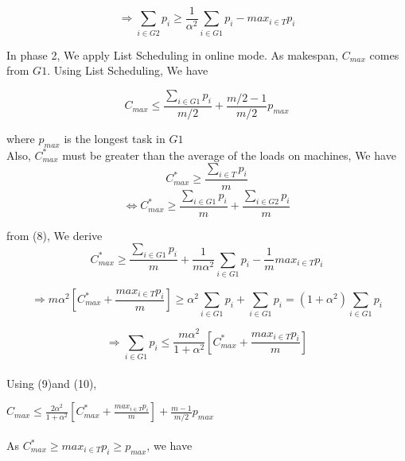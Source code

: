 \documentclass[10pt, conference, compsocconf]{IEEEtran}
\begin{document}
\begin{equation}
\Rightarrow \sum_{i \in G2 }^{}{{p_{i}}} \geq {\frac{1}{\alpha^{2}}} \sum_{i \in G1 }^{}{{p_{i}}} - {max_{i \in T}}{{p_{i}}}
\end{equation}




In phase 2, We  apply List Scheduling in online mode. As makespan, $C_{max}$ comes from $G1$. Using List Scheduling, We have

\begin{equation}
 C_{max} \leq \frac{\sum_{i \in G1 }^{}{{p_{i}}}}{m/2} + {\frac{m/2-1}{m/2}} p_{max} 
\end{equation}

where $p_{max}$ is the longest task in $G1$
\\

Also, $C_{max}^{*}$ must be greater than the average of the  loads on  machines, We have\\

\begin{equation}\nonumber 
C_{max}^{*} \geq  \frac{\sum_{i \in T }^{}{{p_{i}}}}{m}
\end{equation}
\begin{equation}\nonumber
\Leftrightarrow C_{max}^{*}\geq  \frac{\sum_{i \in G1 }^{}{{p_{i}}}}{m} + \frac{\sum_{i \in G2 }^{}{{p_{i}}}}{m} \end{equation}

from (8), We derive\\
\begin{equation}\nonumber
C_{max}^{*} \geq  \frac{\sum_{i \in G1 }^{}{{p_{i}}}}{m} + {\frac{1}{m\alpha^{2}}} \sum_{i \in G1 }^{}{{p_{i}}} - {\frac{1}{m}}{max_{i \in T}}{{p_{i}}} 
\end{equation}

 
\begin{equation}\nonumber
\Rightarrow m\alpha^{2}[C_{max}^{*}+ \frac{{max_{i \in T}}{p_{i}}}{m}] \geq  \alpha^{2} \sum_{i \in G1 }^{}{{p_{i}}} + \sum_{i \in G1 }^{}{{p_{i}}} = (1+\alpha^{2}) \sum_{i \in G1 }^{}{{p_{i}}} \end{equation}

\begin{equation}
\Rightarrow\sum_{i \in G1 }^{}{{p_{i}}} \leq \frac{m\alpha^{2}}{1+ \alpha^{2}}[C_{max}^{*}+ \frac{{max_{i \in T}}{p_{i}}}{m}] 
\end{equation}
\\
Using (9)and (10),

 $C_{max} \leq \frac{2\alpha^{2}}{1+ \alpha^{2}}[C_{max}^{*}+ \frac{{max_{i \in T}}{p_{i}}}{m}]  + {\frac{m-1}{m/2}} p_{max} $ \\
\\
 As $C_{max}^{*}\geq {{max_{i \in T}}{p_{i}}}\geq p_{max}$, we have\\
 
\end{document}

